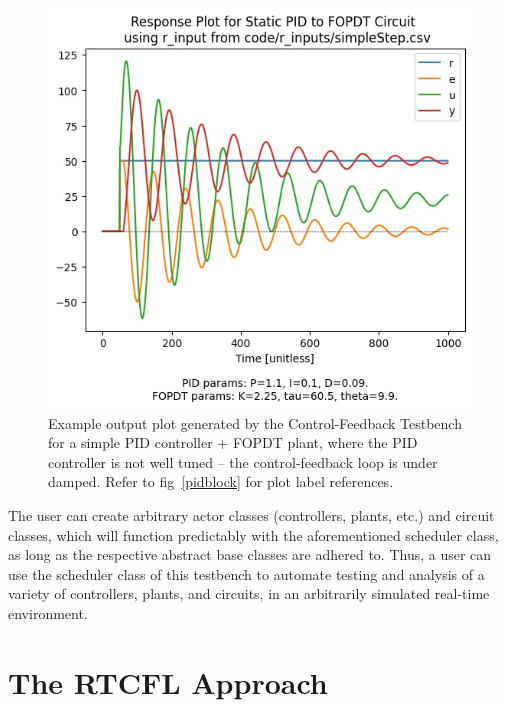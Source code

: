 \documentclass[10pt,twocolumn,letterpaper]{article}
\begin{document}
        \begin{figure}[h]
            \includegraphics[width=\linewidth]{./figures/output_plot_2022Apr25221020.jpg}
            \centering
            \caption{Example output plot generated by the Control-Feedback Testbench for a simple PID controller + FOPDT
                plant, where the PID controller is not well tuned -- the control-feedback loop is under damped. Refer to
                fig~\ref{pidblock} for plot label references.}
            \label{controllertboutputplot}
        \end{figure}

        The user can create arbitrary actor classes (controllers, plants, etc.) and circuit classes, which will function
        predictably with the aforementioned scheduler class, as long as the respective abstract base classes are adhered
        to. Thus, a user can use the scheduler class of this testbench to automate testing and analysis of a variety of
        controllers, plants, and circuits, in an arbitrarily simulated real-time environment.


    \section{The RTCFL Approach} \label{RTCFLexpained}
\end{document}
